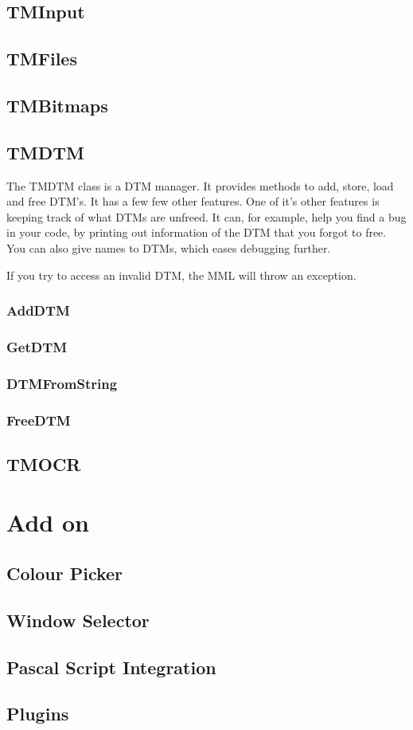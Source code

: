 \documentclass[a4paper]{report}
\begin{document}
\section{TMInput}

\section{TMFiles}

\section{TMBitmaps}

\section{TMDTM}

The TMDTM class is a DTM manager. It provides methods to add, store, load
and free DTM's. It has a few few other features. One of it's other features
is keeping track of what DTMs are unfreed. It can, for example, help you find
a bug in your code, by printing out information of the DTM that you forgot to
free. You can also give names to DTMs, which eases debugging further.

If you try to access an invalid DTM, the MML will throw an exception.


\subsection{AddDTM}
\subsection{GetDTM}
\subsection{DTMFromString}
\subsection{FreeDTM}

\section{TMOCR}

\chapter{Add on}

\section{Colour Picker}

\section{Window Selector}

\section{Pascal Script Integration}

\section{Plugins}
\end{document}
